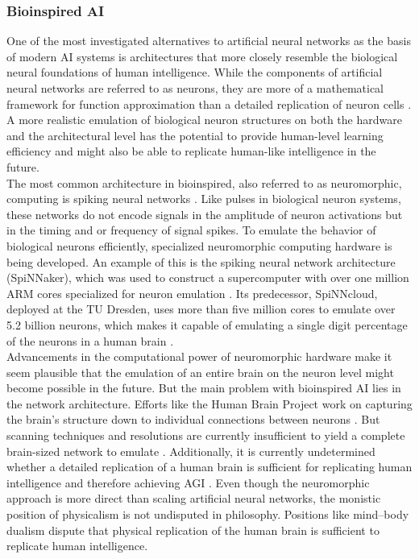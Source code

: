 \subsubsection{Bioinspired AI}
One of the most investigated alternatives to artificial neural networks as the basis of modern AI systems is architectures that more closely resemble the biological neural foundations of human intelligence.
While the components of artificial neural networks are referred to as neurons, they are more of a mathematical framework for function approximation than a detailed replication of neuron cells \citep{sarfraz_study_2023}.
A more realistic emulation of biological neuron structures on both the hardware and the architectural level has the potential to provide human-level learning efficiency and might also be able to replicate human-like intelligence in the future.\\

The most common architecture in bioinspired, also referred to as neuromorphic, computing is spiking neural networks \citep{maass_networks_1997}.
Like pulses in biological neuron systems, these networks do not encode signals in the amplitude of neuron activations but in the timing and or frequency of signal spikes.
To emulate the behavior of biological neurons efficiently, specialized neuromorphic computing hardware is being developed.
An example of this is the spiking neural network architecture (SpiNNaker), which was used to construct a supercomputer with over one million ARM cores specialized for neuron emulation \citep{furber_spinnaker_2014}.
Its predecessor, SpiNNcloud, deployed at the TU Dresden, uses more than five million cores to emulate over 5.2 billion neurons, which makes it capable of emulating a single digit percentage of the neurons in a human brain \citep{gonzalez_spinnaker2_2023}.\\

Advancements in the computational power of neuromorphic hardware make it seem plausible that the emulation of an entire brain on the neuron level might become possible in the future.
But the main problem with bioinspired AI lies in the network architecture.
Efforts like the Human Brain Project work on capturing the brain's structure down to individual connections between neurons \citep{human_brain_project}.
But scanning techniques and resolutions are currently insufficient to yield a complete brain-sized network to emulate \citep{Zanichelli2025StateOB}.
Additionally, it is currently undetermined whether a detailed replication of a human brain is sufficient for replicating human intelligence and therefore achieving AGI \citep[pp.1798-1801]{russell_artificial_2021}.
Even though the neuromorphic approach is more direct than scaling artificial neural networks, the monistic position of physicalism is not undisputed in philosophy. 
Positions like mind–body dualism dispute that physical replication of the human brain is sufficient to replicate human intelligence.


